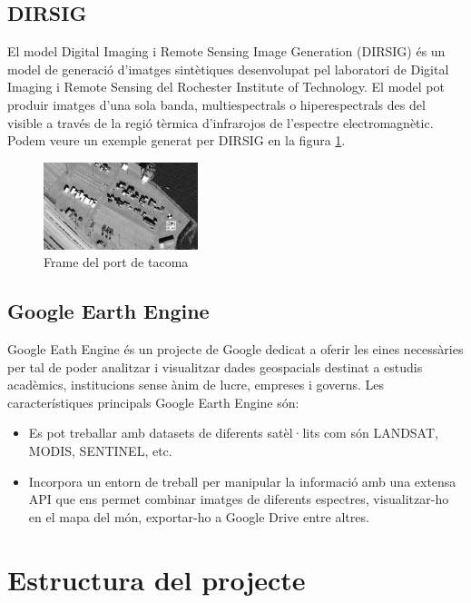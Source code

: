 \documentclass[10pt,a4paper,twocolumn,twoside]{article}
\begin{document}
\subsection{DIRSIG}

El model Digital Imaging i Remote Sensing Image Generation (DIRSIG) és un model de generació d'imatges sintètiques desenvolupat pel laboratori de Digital Imaging i Remote Sensing del Rochester Institute of Technology. El model pot produir imatges d'una sola banda, multiespectrals o hiperespectrals des del visible a través de la regió tèrmica d'infrarojos de l'espectre electromagnètic. Podem veure un exemple generat per DIRSIG en la figura \ref{fig-tacoma}.

\begin{figure}[!h]
\centering
  	\includegraphics[width=0.4\textwidth]{tacoma}
	\caption{Frame del port de tacoma}
	\label{fig-tacoma}
\end{figure}

\subsection{Google Earth Engine}

Google Eath Engine és un projecte de Google dedicat a oferir les eines necessàries per tal de poder analitzar i visualitzar dades geospacials destinat a estudis acadèmics, institucions sense ànim de lucre, empreses i governs. Les característiques principals Google Earth Engine són:

\begin{itemize}
  \item Es pot treballar amb datasets de diferents satèl·lits com són LANDSAT, MODIS, SENTINEL, etc.
  \item Incorpora un entorn de treball per manipular la informació amb una extensa API que ens permet combinar imatges de diferents espectres, visualitzar-ho en el mapa del món, exportar-ho a Google Drive entre altres.
\end{itemize}

\section{Estructura del projecte}
\end{document}
